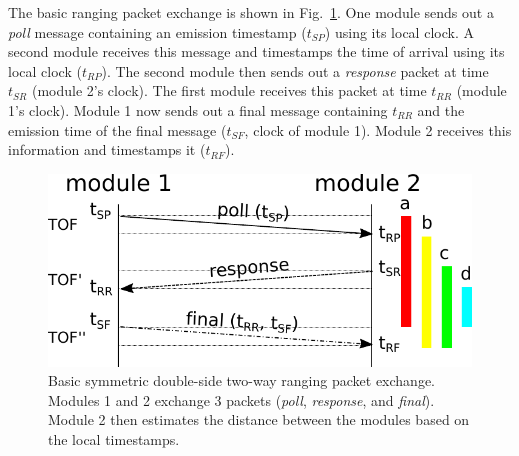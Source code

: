 The basic ranging packet exchange is shown in Fig.~\ref{fig:bidirectional_ranging}.
One module sends out a \emph{poll} message containing an emission timestamp ($t_{SP}$) using its local clock.
A second module receives this message and timestamps the time of arrival using its local clock ($t_{RP}$).
The second module then sends out a \emph{response} packet at time $t_{SR}$ (module 2's clock).
The first module receives this packet at time $t_{RR}$  (module 1's clock).
Module 1 now sends out a final message containing $t_{RR}$ and the emission time of the final message ($t_{SF}$, clock of module 1).
Module 2 receives this information and timestamps it ($t_{RF}$). 


\begin{figure}[tpbh]
 \centering
  \includegraphics[width=.6\linewidth]{tex/img/bidirectional_ranging.pdf}
 \caption{Basic symmetric double-side two-way ranging packet exchange. 
 Modules 1 and 2 exchange 3 packets (\emph{poll}, \emph{response}, and \emph{final}). Module 2 then estimates the distance between the modules based on the local timestamps.}
\label{fig:bidirectional_ranging}
 \end{figure}

